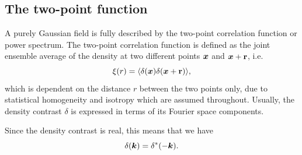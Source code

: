 \subsection{The two-point function}

A purely Gaussian field is fully described by the two-point correlation function or power spectrum. The two-point correlation function is defined as the joint ensemble average of the density at two different points $\bm {x}$ and $\bm {x} + \textbf{r}$, i.e. 
\begin{equation}
	\xi(r) = \langle \delta(\bm {x}) \delta(\bm {x} + \textbf{r}) \rangle,
\end{equation}
which is dependent on the distance $r$ between the two points only, due to statistical homogeneity and isotropy which are assumed throughout. Usually, the density contrast $\delta$ is expressed in terms of its Fourier space components.

Since the density contrast is real, this means that we have
\begin{equation}
	\delta(\bm {k}) = \delta^*(-\bm {k}).
\end{equation}


